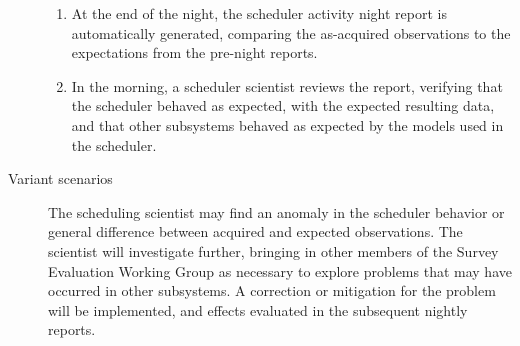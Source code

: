 \begin{description}
\begin{enumerate}
\item At the end of the night, the scheduler activity night report is automatically generated, comparing the as-acquired observations to the expectations from the pre-night reports.
\item In the morning, a scheduler scientist reviews the report, verifying that the scheduler behaved as expected, with the expected resulting data, and that other subsystems behaved as expected by the models used in the scheduler.
\end{enumerate}
\item[{Variant scenarios}] The scheduling scientist may find an anomaly in the scheduler behavior or general difference between acquired and expected observations. The scientist will investigate further, bringing in other members of the Survey Evaluation Working Group as necessary to explore problems that may have occurred in other subsystems.  A correction or mitigation for the problem will be implemented, and effects evaluated in the subsequent nightly reports.
\end{description}

